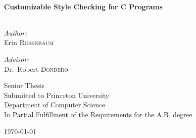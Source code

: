 \begin{titlepage}

\begin{center}




\HRule \\[0.4cm]
{ \huge \bfseries Customizable Style Checking for C Programs}\\[0.4cm]

\HRule \\[1.5cm]

\begin{minipage}{0.4\textwidth}
\begin{flushleft} \large
\emph{Author:}\\
Erin \textsc{Rosenbaum}
\end{flushleft}
\end{minipage}
\begin{minipage}{0.4\textwidth}
\begin{flushright} \large
\emph{Advisor:} \\
Dr.~Robert \textsc{Dondero}
\end{flushright}
\end{minipage}

\vspace{5cm}
\small{
Senior Thesis \\[0.4cm]
Submitted to Princeton University \\
Department of Computer Science\\
In Partial Fulfillment of the Requirements for the A.B. degree \\
}

\vfill

{\large \today}

\end{center}

\end{titlepage}
